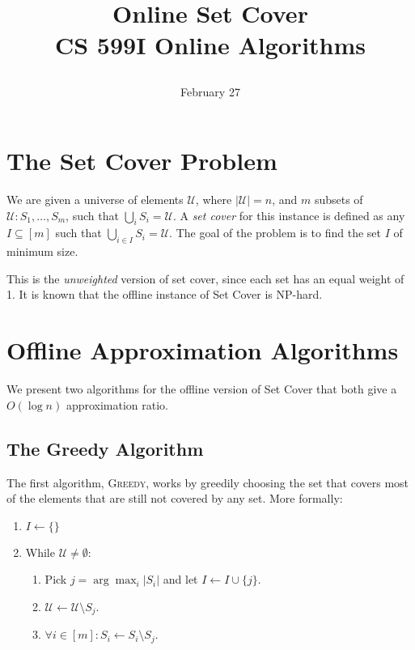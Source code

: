 \documentclass[10pt,a4paper]{article}
\newcommand{\mU}{\mathcal{U}}
\newcommand{\greedy}{\textsc{Greedy}}
\begin{document}
\title{Online Set Cover \\[1 cm] 
\large{CS 599I  Online Algorithms}
\date{February 27}}  
\maketitle

\section{The Set Cover Problem}

We are given a universe of elements $\mU$, where $|\mU| = n$, and $m$ subsets of $\mU: S_1, \dots, S_m$, such that $\bigcup_i S_i = \mU$. A {\em set cover} for this instance is defined as any $I \subseteq [m]$ such that $\bigcup_{i \in I} S_i = \mU$. The goal of the problem is to find the set $I$ of minimum size. 

This is the {\em unweighted} version of set cover, since each set has an equal weight of 1. It is known that the offline instance of Set Cover is NP-hard.

\section{Offline Approximation Algorithms}

We present two algorithms for the offline version of Set Cover that both give a $O(\log n)$ approximation ratio. 

\subsection{The Greedy Algorithm}

The first algorithm, \greedy, works by greedily choosing the set that covers most of the elements that are still not covered by any set. More formally:

\begin{enumerate}
\item $I \leftarrow \{\}$
\item While $\mU \neq \emptyset$:
\begin{enumerate}
\item Pick $j = \arg \max_i |S_i|$ and let $I \leftarrow I \cup \{j\}$.
\item $\mU \leftarrow \mU \setminus S_j$.
\item $\forall i \in [m]: S_i \leftarrow S_i \setminus S_j$.
\end{enumerate}

\end{enumerate}
\end{document}
